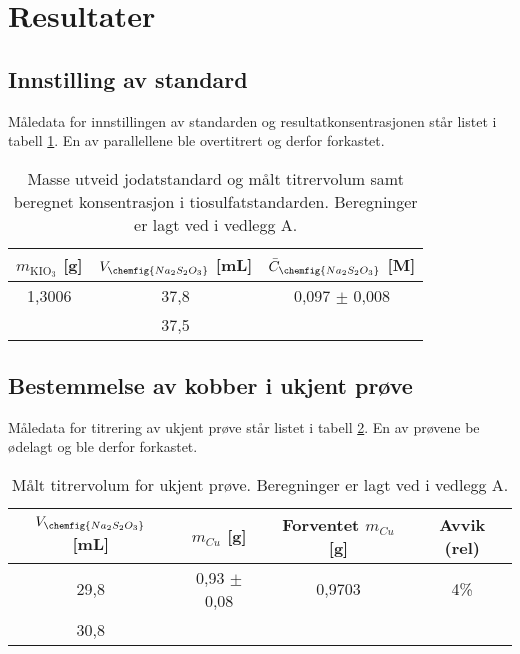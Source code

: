  
\section{Resultater}

\subsection{Innstilling av standard}

Måledata for innstillingen av standarden og resultatkonsentrasjonen står listet i tabell \ref{tab:inst}. En av parallellene ble overtitrert og derfor forkastet.

\begin{table}[!htb]
    \centering
    \begin{tabular}{c | c | c}
        $m_{\text{KIO}_3}$ [g]  & $V_{\chemfig{Na_2 S_2 O_3}}$ [mL]     & $\bar C_{\chemfig{Na_2 S_2 O_3}}$ [M] \\
        \hline
        1,3006                  & 37,8                                  & 0,097 $\pm$ 0,008    \\
                                & 37,5
    \end{tabular}
    \caption{Masse utveid jodatstandard og målt titrervolum samt beregnet konsentrasjon i tiosulfatstandarden. Beregninger er lagt ved i vedlegg A.}
    \label{tab:inst}
\end{table}


\subsection{Bestemmelse av kobber i ukjent prøve}

Måledata for titrering av ukjent prøve står listet i tabell \ref{tab:prov}. En av prøvene be ødelagt og ble derfor forkastet.

\begin{table}[!htb]
    \centering
    \begin{tabular}{c | c | c | c}
        $V_{\chemfig{Na_2 S_2 O_3}}$ [mL]   & $m_{Cu}$ [g]          & Forventet $m_{Cu}$ [g]    & Avvik (rel)    \\
        \hline
        29,8                                & 0,93 $\pm$ 0,08       & 0,9703                    & 4\%   \\
        30,8                                &                       &
    \end{tabular}
    \caption{Målt titrervolum for ukjent prøve. Beregninger er lagt ved i vedlegg A.}
    \label{tab:prov}
\end{table}


